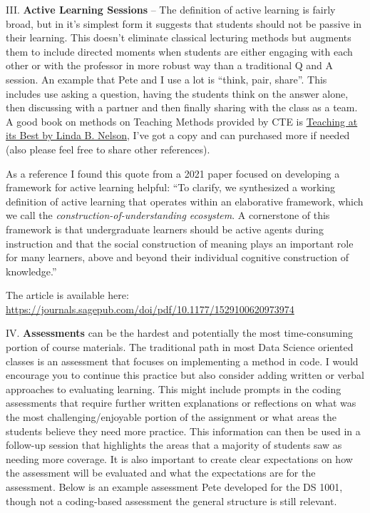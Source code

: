 \documentclass[
  letterpaper,
  DIV=11,
  numbers=noendperiod]{scrreprt}
\begin{document}
III. \textbf{Active Learning Sessions} -- The definition of active
learning is fairly broad, but in it's simplest form it suggests that
students should not be passive in their learning. This doesn't eliminate
classical lecturing methods but augments them to include directed
moments when students are either engaging with each other or with the
professor in more robust way than a traditional Q and A session. An
example that Pete and I use a lot is ``think, pair, share''. This
includes use asking a question, having the students think on the answer
alone, then discussing with a partner and then finally sharing with the
class as a team. A good book on methods on Teaching Methods provided by
CTE is
\href{https://books.google.com/books?id=1jB_DAAAQBAJ\&printsec=frontcover\&source=gbs_ge_summary_r\&cad=0\#v=onepage\&q\&f=false}{Teaching
at its Best by Linda B. Nelson,} I've got a copy and can purchased more
if needed (also please feel free to share other references).

As a reference I found this quote from a 2021 paper focused on
developing a framework for active learning helpful: ``To clarify, we
synthesized a working definition of active learning that operates within
an elaborative framework, which we call the
\emph{construction-of-understanding ecosystem}. A cornerstone of this
framework is that undergraduate learners should be active agents during
instruction and that the social construction of meaning plays an
important role for many learners, above and beyond their individual
cognitive construction of knowledge.''

The article is available here:
\url{https://journals.sagepub.com/doi/pdf/10.1177/1529100620973974}

IV. \textbf{Assessments} can be the hardest and potentially the most
time-consuming portion of course materials. The traditional path in most
Data Science oriented classes is an assessment that focuses on
implementing a method in code. I would encourage you to continue this
practice but also consider adding written or verbal approaches to
evaluating learning. This might include prompts in the coding
assessments that require further written explanations or reflections on
what was the most challenging/enjoyable portion of the assignment or
what areas the students believe they need more practice. This
information can then be used in a follow-up session that highlights the
areas that a majority of students saw as needing more coverage. It is
also important to create clear expectations on how the assessment will
be evaluated and what the expectations are for the assessment. Below is
an example assessment Pete developed for the DS 1001, though not a
coding-based assessment the general structure is still relevant.
\end{document}
